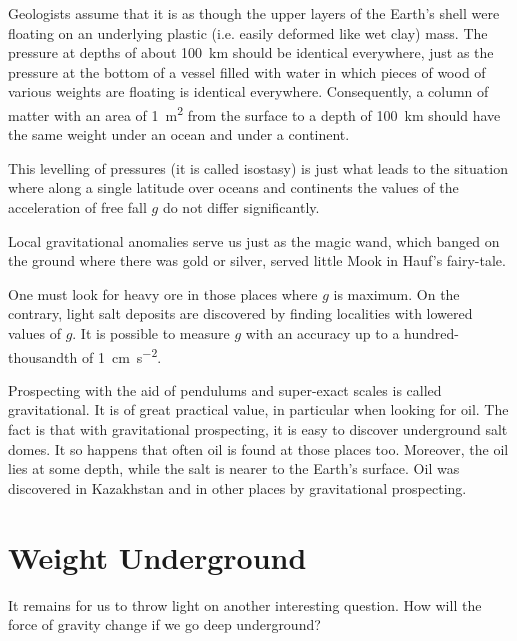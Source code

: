 Geologists assume that it is as though the upper layers
of the Earth's shell were floating on an underlying plastic
(i.e. easily deformed like wet clay) mass. The pressure
at depths of about \SI{100}{\kilo\meter} should be identical everywhere,
just as the pressure at the bottom of a vessel filled with
water in which pieces of wood of various weights are
floating is identical everywhere. Consequently, a column
of matter with an area of \SI{1}{\meter\squared} from the surface to a depth
of \SI{100}{\kilo\meter} should have the same weight under an ocean
and under a continent.

This levelling of pressures (it is called isostasy) is just
what leads to the situation where along a single latitude
over oceans and continents the values of the acceleration
of free fall $g$ do not differ significantly.

Local gravitational anomalies serve us just as the
magic wand, which banged on the ground where there
was gold or silver, served little Mook in Hauf's fairy-tale.

One must look for heavy ore in those places where $g$ is
maximum. On the contrary, light salt deposits are discovered by finding localities with lowered values of $g$.
It is possible to measure $g$ with an accuracy up to a hundred-thousandth of \SI{1}{\centi\meter\per\second\squared}.

Prospecting with the aid of pendulums and super-exact
scales is called gravitational. It is of great practical
value, in particular when looking for oil. The fact is
that with gravitational prospecting, it is easy to discover
underground salt domes. It so happens that often oil is
found at those places too. Moreover, the oil lies at some
depth, while the salt is nearer to the Earth's surface.
Oil was discovered in Kazakhstan and in other places
by gravitational prospecting.

\section{Weight Underground}

It remains for us to throw light on another interesting
question. How will the force of gravity change if we go
deep underground?


